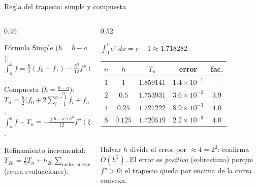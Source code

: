 \documentclass[aspectratio=169,10pt]{beamer}
\begin{document}
\begin{frame}{Regla del trapecio: simple y compuesta}
\begin{columns}[T]
\begin{column}{0.46\textwidth}
\begin{cardidea}{Fórmula}{\faSuperscript}
{\footnotesize Simple ($h=b-a$):\\[0.2mm]
$\int_a^b f=\tfrac{h}{2}(f_0+f_1)-\tfrac{h^3}{12}f''(\xi)$.\\[1.0mm]
Compuesta ($h=\tfrac{b-a}{n}$):\\[0.2mm]
$T_n=\tfrac{h}{2}\big(f_0+2\!\sum_{i=1}^{n-1}\!f_i+f_n\big)$,\\[0.4mm]
$\displaystyle\int_a^b f-T_n=-\tfrac{(b-a)h^2}{12}f''(\xi)=O(h^2)$.}
\end{cardidea}
\vspace{1mm}
\begin{cardnota}[\faInfoCircle]
{\footnotesize Refinamiento incremental: $T_{2n}=\tfrac12T_n+h_{2n}\!\!\sum_{\text{nodos nuevos}}\!\!f(x_i)$ (reusa evaluaciones).}
\end{cardnota}
\end{column}
\begin{column}{0.52\textwidth}
\begin{cardgear}{$\int_0^1 e^x\,dx=e-1\approx1.718282$}{\faTable}
\centering
{\footnotesize\renewcommand{\arraystretch}{1.3}\setlength{\tabcolsep}{6pt}
\begin{tabular}{c|c|c|cc}
$n$ & $h$ & $T_n$ & error & fac.\\\hline
$1$ & $1$ & $1.859141$ & $1.4{\times}10^{-1}$ & —\\
$2$ & $0.5$ & $1.753931$ & $3.6{\times}10^{-2}$ & $3.9$\\
$4$ & $0.25$ & $1.727222$ & $8.9{\times}10^{-3}$ & $4.0$\\
$8$ & $0.125$ & $1.720519$ & $2.2{\times}10^{-3}$ & $4.0$\\
\end{tabular}}\\[1.4mm]
{\footnotesize Halvar $h$ divide el error por $\approx4=2^2$: confirma $O(h^2)$. El error es \emph{positivo} (sobrestima) porque $f''>0$: el trapecio queda por encima de la curva convexa.}
\end{cardgear}
\end{column}
\end{columns}
\end{frame}
\end{document}
